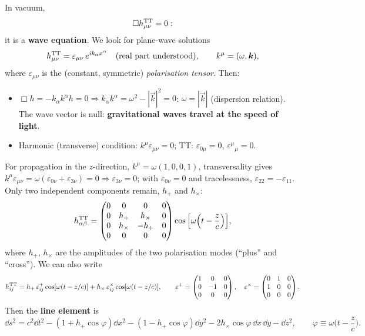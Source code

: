 In vacuum,
\begin{equation}
  \Box h^{\rm TT}_{\mu\nu}=0 :
\end{equation}
it is a \textbf{wave equation}. We look for plane-wave solutions
\begin{equation}
  h^{\rm TT}_{\mu\nu}=\varepsilon_{\mu\nu}\,e^{ik_\alpha x^\alpha}\quad(\text{real part understood}),\qquad k^\mu=(\omega,\vec k),
\end{equation}
where $\varepsilon_{\mu\nu}$ is the (constant, symmetric) \emph{polarisation tensor}. Then:
\begin{itemize}
\item $\Box h=-k_\alpha k^\alpha h=0\Rightarrow k_\alpha k^\alpha=\omega^2-|\vec k|^2=0$: $\omega=|\vec k|$ (dispersion relation). The wave vector is null: \textbf{gravitational waves travel at the speed of light}.
\item Harmonic (transverse) condition: $k^\mu\varepsilon_{\mu\nu}=0$; TT: $\varepsilon_{0\mu}=0$, $\varepsilon^\mu{}_\mu=0$.
\end{itemize}
For propagation in the $z$-direction, $k^\mu=\omega(1,0,0,1)$, transversality gives $k^\mu\varepsilon_{\mu\nu}=\omega(\varepsilon_{0\nu}+\varepsilon_{3\nu})=0\Rightarrow\varepsilon_{3\nu}=0$; with $\varepsilon_{0\nu}=0$ and tracelessness, $\varepsilon_{22}=-\varepsilon_{11}$. Only two independent components remain, $h_+$ and $h_\times$:
\begin{equation}
  h^{\rm TT}_{\alpha\beta}=\begin{pmatrix}0&0&0&0\\0&h_+&h_\times&0\\0&h_\times&-h_+&0\\0&0&0&0\end{pmatrix}\cos\Big[\omega\Big(t-\frac zc\Big)\Big],
\end{equation}
where $h_+$, $h_\times$ are the amplitudes of the two polarisation modes (``plus'' and ``cross''). We can also write
\[
  h^{\rm TT}_{ij}=h_+\,\varepsilon^+_{ij}\cos[\omega(t-z/c)]+h_\times\,\varepsilon^\times_{ij}\cos[\omega(t-z/c)],\qquad
  \varepsilon^+=\begin{pmatrix}1&0&0\\0&-1&0\\0&0&0\end{pmatrix},\quad\varepsilon^\times=\begin{pmatrix}0&1&0\\1&0&0\\0&0&0\end{pmatrix}.
\]
Then the \textbf{line element} is
\begin{equation}
  \dd s^2=c^2\dd t^2-(1+h_+\cos\varphi)\dd x^2-(1-h_+\cos\varphi)\dd y^2-2h_\times\cos\varphi\,\dd x\,\dd y-\dd z^2,\qquad\varphi\equiv\omega\Big(t-\frac zc\Big).
\end{equation}

